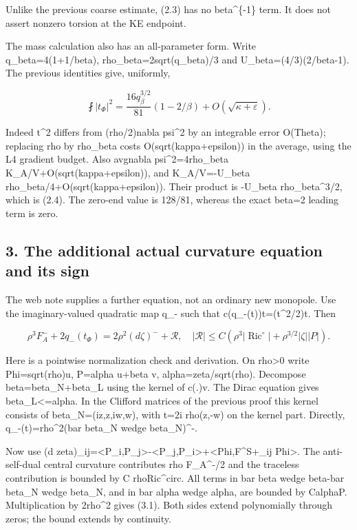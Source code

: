 \documentclass[
  10pt,
]{article}
\begin{document}
Unlike the previous coarse estimate, (2.3) has no beta\^{}\{-1\} term.
It does not assert nonzero torsion at the KE endpoint.

The mass calculation also has an all-parameter form. Write
q\_beta=4(1+1/beta), rho\_beta=2sqrt(q\_beta)/3 and
U\_beta=(4/3)(2/beta-1). The previous identities give, uniformly,

\[
 \boxed{\fint|t_\Phi|^2
 =\frac{16q_\beta^{3/2}}{81}(1-2/\beta)
       +O(\sqrt{\kappa+\varepsilon}).}                \tag{2.4}
\]

Indeed \textbar t\textbar\^{}2 differs from (rho/2)\textbar nabla
psi\textbar\^{}2 by an integrable error O(Theta); replacing rho by
rho\_beta costs O(sqrt(kappa+epsilon)) in the average, using the L4
gradient budget. Also avg\textbar nabla psi\textbar\^{}2=4rho\_beta
K\_A/V+O(sqrt(kappa+epsilon)), and K\_A/V=-U\_beta
rho\_beta/4+O(sqrt(kappa+epsilon)). Their product is -U\_beta
rho\_beta\^{}3/2, which is (2.4). The zero-end value is 128/81, whereas
the exact beta=2 leading term is zero.

\hypertarget{the-additional-actual-curvature-equation-and-its-sign}{%
\subsection{3. The additional actual curvature equation and its
sign}\label{the-additional-actual-curvature-equation-and-its-sign}}

The web note supplies a further equation, not an ordinary new monopole.
Use the imaginary-valued quadratic map q\_- such that
c(q\_-(t))t=(\textbar t\textbar\^{}2/2)t. Then

\[
 \rho^3F_A^-+2q_-(t_\Phi)=2\rho^2(d\zeta)^-+\mathcal R,
 \quad
 |\mathcal R|\le C\left(\rho^3|\operatorname{Ric}^\circ|
                  +\rho^{3/2}|\zeta||P|\right).       \tag{3.1}
\]

Here is a pointwise normalization check and derivation. On
rho\textgreater0 write Phi=sqrt(rho)u, P=alpha u+beta v,
alpha=zeta/sqrt(rho). Decompose beta=beta\_N+beta\_L using the kernel of
c(.)v. The Dirac equation gives
\textbar beta\_L\textbar\textless=\textbar alpha\textbar. In the
Clifford matrices of the previous proof this kernel consists of
beta\_N=(iz,z,iw,w), with t=2i rho(z,-w) on the kernel part. Directly,
q\_-(t)=rho\^{}2(bar beta\_N wedge beta\_N)\^{}-.

Now use (d
zeta)\_ij=\textless P\_i,P\_j\textgreater-\textless P\_j,P\_i\textgreater+\textless Phi,F\^{}S+\_ij
Phi\textgreater. The anti-self-dual central curvature contributes rho
F\_A\^{}-/2 and the traceless contribution is bounded by C
rho\textbar Ric\^{}circ\textbar. All terms in bar beta wedge beta-bar
beta\_N wedge beta\_N, and in bar alpha wedge alpha, are bounded by
C\textbar alpha\textbar\textbar P\textbar. Multiplication by 2rho\^{}2
gives (3.1). Both sides extend polynomially through zeros; the bound
extends by continuity.
\end{document}
